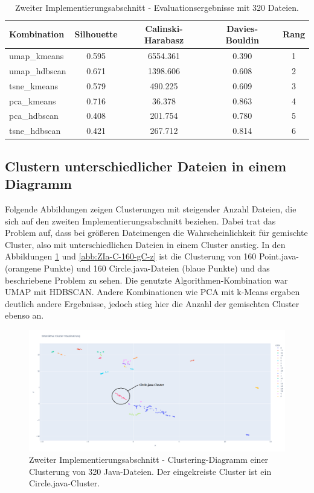 \setlength{\tabcolsep}{5.5pt}
\begin{table}[h]
\centering
\begin{tabular}{lcccc}
\hline
\textbf{Kombination} & \textbf{Silhouette} & \textbf{Calinski-Harabasz} & \textbf{Davies-Bouldin} & \textbf{Rang} \\
\hline
umap\_kmeans    & 0.595 & 6554.361 & 0.390 & 1 \\
umap\_hdbscan   & 0.671 & 1398.606 & 0.608 & 2 \\
tsne\_kmeans    & 0.579 & 490.225  & 0.609 & 3 \\
pca\_kmeans     & 0.716 & 36.378   & 0.863 & 4 \\
pca\_hdbscan    & 0.408 & 201.754  & 0.780 & 5 \\
tsne\_hdbscan   & 0.421 & 267.712  & 0.814 & 6 \\
\hline
\end{tabular}
\caption{Zweiter Implementierungsabschnitt - Evaluationsergebnisse mit 320 Dateien.}
\label{tab:ZIa-EI-EV-160}
\end{table}


\subsection{Clustern unterschiedlicher Dateien in einem Diagramm}
\label{abs:C-u-D-i-e-D}
Folgende Abbildungen zeigen Clusterungen mit steigender Anzahl Dateien, die sich auf den zweiten Implementierungsabschnitt beziehen. Dabei trat das Problem auf, dass bei größeren Dateimengen die Wahrscheinlichkeit für gemischte Cluster, also mit unterschiedlichen Dateien in einem Cluster anstieg. In den Abbildungen \ref{abb:ZIa-C-160-gC} und \ref{abb:ZIa-C-160-gC-z} ist die Clusterung von 160 Point.java- (orangene Punkte) und 160 Circle.java-Dateien (blaue Punkte) und das beschriebene Problem zu sehen. Die genutzte Algorithmen-Kombination war UMAP mit HDBSCAN. Andere Kombinationen wie PCA mit k-Means ergaben deutlich andere Ergebnisse, jedoch stieg hier die Anzahl der gemischten Cluster ebenso an.

\begin{figure} %
	\centering
	\includegraphics[width=1.0\textwidth]{images/Clusterung - 160 - gemischte Cluster.pdf}
	\caption{Zweiter Implementierungsabschnitt - Clustering-Diagramm einer Clusterung von 320 Java-Dateien. Der eingekreiste Cluster ist ein Circle.java-Cluster.}
	\label{abb:ZIa-C-160-gC}
\end{figure}

